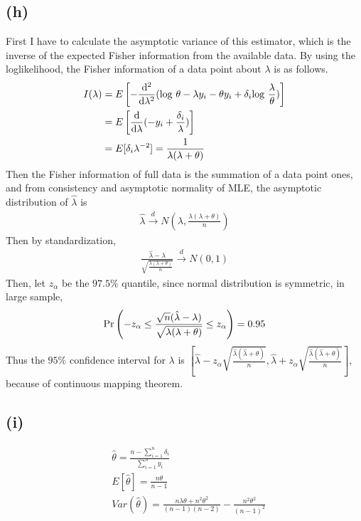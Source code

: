 \documentclass{article}
\begin{document}
\subsection{(h)}
First I have to calculate the asymptotic variance of this estimator, which is the inverse of the expected Fisher information from the available data. By using the loglikelihood, the Fisher information of a data point about $\lambda$ is as follows.
\begin{align*}
	I(\lambda) &= E\left[ -\frac{\mathrm{d}^2}{\mathrm{d}\lambda^2} ({\rm log}\ \theta - \lambda y_i - \theta y_i + \delta_i {\rm log}\ \frac{\lambda}{\theta}) \right]\\
	&= E\left[ \frac{\mathrm{d}}{\mathrm{d}\lambda} (-y_i + \frac{\delta_i}{\lambda}) \right]\\
	&= E[\delta_i \lambda^{-2}] = \frac{1}{\lambda(\lambda+\theta)}
\end{align*}
Then the Fisher information of full data is the summation of a data point ones, and from consistency and asymptotic normality of MLE, the asymptotic distribution of $\hat{\lambda}$ is
\begin{align*}
	\hat{\lambda} \stackrel{d}{\longrightarrow} N \left(\lambda, \frac{\lambda(\lambda+\theta)}{n} \right)
\end{align*}
Then by standardization,
\begin{align*}
	\frac{\hat{\lambda} - \lambda}{\sqrt{\frac{\lambda(\lambda+\theta)}{n}}} \stackrel{d}{\longrightarrow} N(0, 1)
\end{align*}
Then, let $z_{\alpha}$ be the $97.5\%$ quantile, since normal distribution is symmetric, in large sample,
\begin{align*}
	{\rm Pr}\left( -z_{\alpha} \leq \frac{\sqrt{n}(\hat{\lambda} - \lambda)}{\sqrt{\lambda(\lambda+\theta)}} \leq z_{\alpha}\right) = 0.95
\end{align*}
Thus the $95\%$ confidence interval for $\lambda$ is $\left[ \hat{\lambda} - z_{\alpha} \sqrt{\frac{\hat{\lambda} (\hat{\lambda}+\theta)}{n}}, \hat{\lambda} + z_{\alpha} \sqrt{\frac{\hat{\lambda} (\hat{\lambda}+\theta)}{n}}\right]$, because of continuous mapping theorem.

\subsection{(i)}
\begin{align*}
	&\hat{\theta} = \frac{n - \sum_{i=1}^n \delta_i}{\sum_{i=1}^n y_i}\\[10pt]
	&E[\hat{\theta}] = \frac{n\theta}{n-1} \\[10pt]
	&Var(\hat{\theta}) = \frac{n\lambda\theta + n^2\theta^2}{(n-1)(n-2)} - \frac{n^2\theta^2}{(n-1)^2}
\end{align*}
\end{document}
